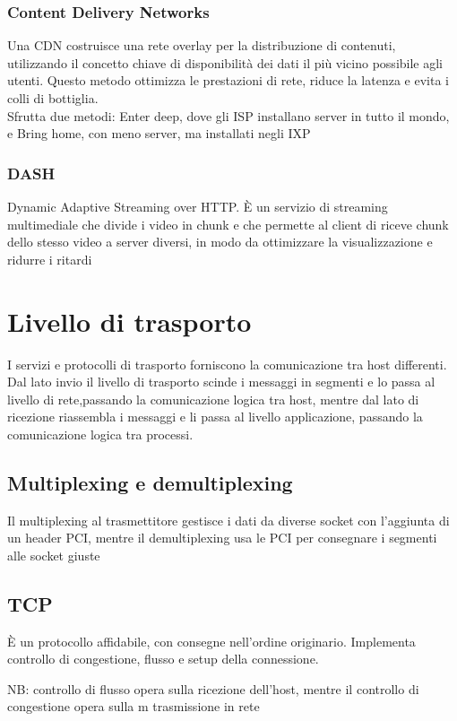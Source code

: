 \documentclass[12pt, a4paper]{article}
\begin{document}
\subsubsection*{Content Delivery Networks}
Una CDN costruisce una rete overlay per la distribuzione di contenuti, utilizzando il concetto chiave di disponibilità
dei dati il più vicino possibile agli utenti. Questo metodo ottimizza le prestazioni di rete, riduce la latenza e 
evita i colli di bottiglia.\\Sfrutta due metodi: Enter deep, dove gli ISP installano server in tutto il mondo, e Bring 
home, con meno server, ma installati negli IXP

\subsubsection*{DASH}
Dynamic Adaptive Streaming over HTTP. È un servizio di streaming multimediale che divide i video in chunk e che 
permette al client di riceve chunk dello stesso video a server diversi, in modo da ottimizzare la visualizzazione
e ridurre i ritardi

\newpage
\section{Livello di trasporto}
I servizi e protocolli di trasporto forniscono la comunicazione tra host differenti. Dal lato invio il livello di 
trasporto scinde i messaggi in segmenti e lo passa al livello di rete,passando la comunicazione logica tra host,
mentre dal lato di ricezione riassembla i messaggi e li passa al livello applicazione, passando la comunicazione 
logica tra processi.

\subsection{Multiplexing e demultiplexing}
Il multiplexing al trasmettitore gestisce i dati da diverse socket con l'aggiunta di un header PCI, mentre il 
demultiplexing usa le PCI per consegnare i segmenti alle socket giuste

\subsection{TCP}
È un protocollo affidabile, con consegne nell'ordine originario. Implementa controllo di congestione, flusso e 
setup della connessione.

NB: controllo di flusso opera sulla ricezione dell'host, mentre il controllo di congestione opera sulla m
trasmissione in rete
\end{document}
